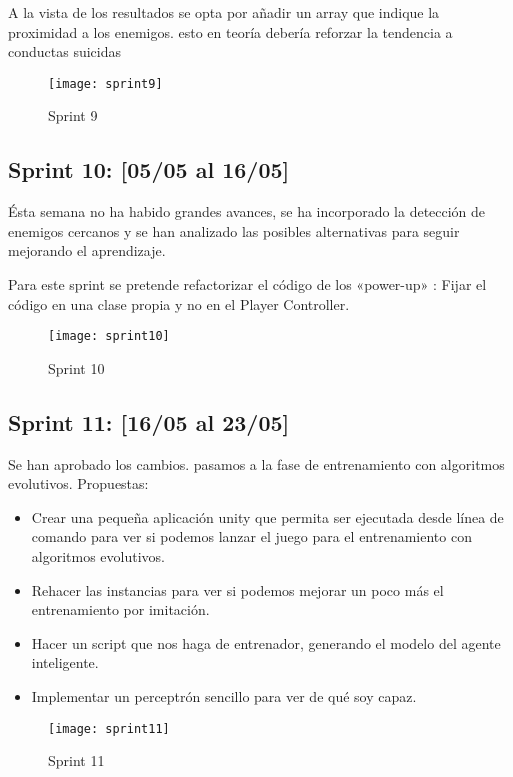   A la vista de los resultados se opta por añadir un array que indique la proximidad a los enemigos. esto en teoría debería reforzar la tendencia a conductas suicidas
  

\begin{figure}[h!]
    \centering
    \texttt{[image: sprint9]}
    \caption{Sprint 9}
    \label{fig:s9}
\end{figure}

\subsection{Sprint 10: [05/05 al 16/05]}

Ésta semana no ha habido grandes avances, se ha incorporado la detección de enemigos cercanos y se han analizado las posibles alternativas para seguir mejorando el aprendizaje.

Para este sprint se pretende refactorizar el código de los «power-up» : Fijar el código en una clase propia y no en el Player Controller.

\begin{figure}[h!]
    \centering
    \texttt{[image: sprint10]}
    \caption{Sprint 10}
    \label{fig:s10}
\end{figure}


\subsection{Sprint 11: [16/05 al 23/05]}

Se han aprobado los cambios. pasamos a la fase de entrenamiento con algoritmos evolutivos.
Propuestas:
\begin{itemize}
    \item Crear una pequeña aplicación unity que permita ser ejecutada desde línea de comando para ver si podemos lanzar el juego para el entrenamiento con algoritmos evolutivos.
    \item Rehacer las instancias para ver si podemos mejorar un poco más el entrenamiento por imitación.
    \item Hacer un script que nos haga de entrenador, generando el modelo del agente inteligente.
    \item Implementar un perceptrón sencillo para ver de qué soy capaz.
\end{itemize} 

\begin{figure}[h!]
    \centering
    \texttt{[image: sprint11]}
    \caption{Sprint 11}
    \label{fig:s11}
\end{figure}


